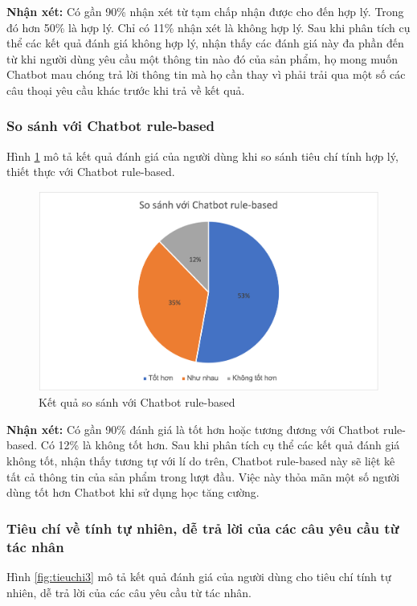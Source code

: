 \textbf{Nhận xét:}
Có gần 90\% nhận xét từ tạm chấp nhận được cho đến hợp lý. Trong đó
hơn 50\% là hợp lý. Chỉ có 11\% nhận xét là không hợp lý. Sau khi
phân tích cụ thể các kết quả đánh giá không hợp lý, nhận thấy các
đánh giá này đa phần đến từ khi người dùng yêu cầu một thông tin
nào đó của sản phẩm, họ mong muốn Chatbot mau chóng trả lời thông tin
mà họ cần thay vì phải trải qua một số các câu thoại yêu cầu khác
trước khi trả về kết quả.

\subsubsection{So sánh với Chatbot rule-based}
Hình \ref{fig:tieuchi22} mô tả kết quả đánh giá của người dùng khi
so sánh tiêu chí tính hợp lý, thiết thực với Chatbot rule-based.

\begin{figure}[ht!]
    \centering
    \includegraphics[scale=0.91]{thesis/chatbot/ketqua/img/tieuchi2_2.png}
    \caption{Kết quả so sánh với Chatbot rule-based}
    \label{fig:tieuchi22}
\end{figure}

\textbf{Nhận xét:}
Có gần 90\% đánh giá là tốt hơn hoặc tương đương với Chatbot
rule-based. Có 12\% là không tốt hơn. Sau khi phân tích cụ thể các
kết quả đánh giá không tốt, nhận thấy tương tự với lí do trên,
Chatbot rule-based này sẽ liệt kê tất cả thông tin của sản phẩm
trong lượt đầu. Việc này thỏa mãn một số người dùng tốt hơn Chatbot
khi sử dụng học tăng cường.

\subsubsection{Tiêu chí về tính tự nhiên, dễ trả lời của các câu
yêu cầu từ tác nhân}
Hình \ref{fig:tieuchi3} mô tả kết quả đánh giá của người dùng cho
tiêu chí tính tự nhiên, dễ trả lời của các câu yêu cầu từ tác nhân.

